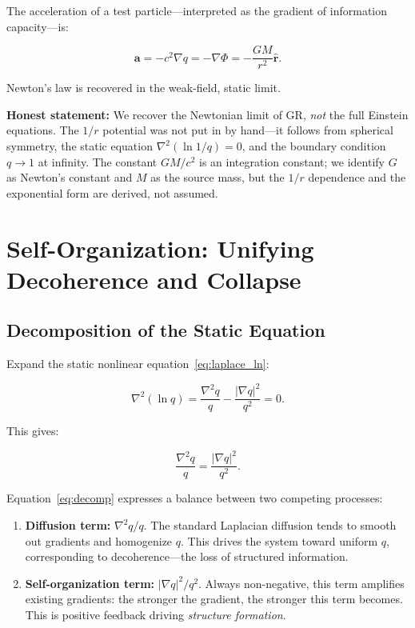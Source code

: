 \documentclass[aps,prd,twocolumn,showpacs,superscriptaddress,preprintnumbers]{revtex4-2}
\begin{document}
The acceleration of a test particle---interpreted as the gradient of information capacity---is:

\begin{equation}
\mathbf{a} = -c^2 \nabla q = -\nabla\Phi = -\frac{GM}{r^2}\hat{\mathbf{r}}.
\label{eq:accel}
\end{equation}

Newton's law is recovered in the weak-field, static limit.

\textbf{Honest statement:} We recover the Newtonian limit of GR, \emph{not} the full Einstein equations.
The $1/r$ potential was not put in by hand---it follows from spherical symmetry, the static equation $\nabla^2(\ln 1/q)=0$, and the boundary condition $q\to1$ at infinity.
The constant $GM/c^2$ is an integration constant; we identify $G$ as Newton's constant and $M$ as the source mass, but the $1/r$ dependence and the exponential form are derived, not assumed.

\section{Self-Organization: Unifying Decoherence and Collapse}
\label{sec:selforg}

\subsection{Decomposition of the Static Equation}

Expand the static nonlinear equation~\eqref{eq:laplace_ln}:

\begin{equation}
\nabla^2(\ln q) = \frac{\nabla^2 q}{q} - \frac{|\nabla q|^2}{q^2} = 0.
\label{eq:expand_ln}
\end{equation}

This gives:

\begin{equation}
\boxed{\frac{\nabla^2 q}{q} = \frac{|\nabla q|^2}{q^2}}.
\label{eq:decomp}
\end{equation}

Equation~\eqref{eq:decomp} expresses a balance between two competing processes:

\begin{enumerate}
    \item \textbf{Diffusion term:} $\nabla^2 q/q$. The standard Laplacian diffusion tends to smooth out gradients and homogenize $q$. This drives the system toward uniform $q$, corresponding to decoherence---the loss of structured information.

    \item \textbf{Self-organization term:} $|\nabla q|^2/q^2$. Always non-negative, this term amplifies existing gradients: the stronger the gradient, the stronger this term becomes. This is positive feedback driving \emph{structure formation}.
\end{enumerate}
\end{document}
